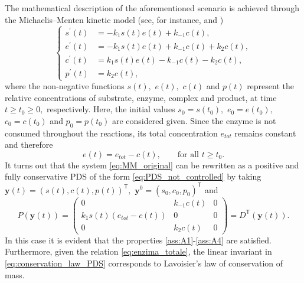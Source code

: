 \documentclass[10pt]{article}
\theoremstyle{remark}
\newcommand{\tpose}{^\mathsf{T}}
\theoremstyle{definition}
\theoremstyle{remark}
\begin{document}
The mathematical description of the aforementioned scenario is achieved through the Michaelis–Menten kinetic model (see, for instance, \cite[Section 3.1]{Ingalls2013} and \cite{Michaelis2})
\begin{equation}\label{eq:MM_original}
    \left\{
    \begin{aligned}
        s^{\prime}(t) &= - k_1 s(t)e(t) + k_{-1} c(t), \\
        e^{\prime}(t) &= - k_1 s(t) e(t) + k_{-1} c(t) + k_2  c(t), \\
        c^{\prime}(t) &= k_1 s(t) e(t) - k_{-1} c(t) -  k_2 c(t), \\
        p^{\prime}(t) &= k_2 c(t),
    \end{aligned}
    \right.
\end{equation}
where the non-negative functions $s(t),$ $e(t),$ $c(t)$ and $p(t)$ represent the relative concentrations of substrate, enzyme, complex and product, at time $t\geq t_0\geq 0,$ respectively. Here, the initial values $s_0=s(t_0),$ $e_0=e(t_0),$ $c_0=c(t_0)$ and $p_0=p(t_0)$ are considered given. 
Since the enzyme is not consumed throughout the reactions, its total concentration $e_{tot}$ remains constant and therefore
\begin{equation}\label{eq:enzima_totale}
    e(t) = e_{tot} - c(t), \qquad \mbox{for all } t \geq t_0.
\end{equation}
It turns out that the system \eqref{eq:MM_original} can be rewritten as a positive and fully conservative PDS of the form \eqref{eq:PDS_not_controlled} by taking  $\bm{y}(t)=(s(t),c(t),p(t))\tpose,$ $\bm{y}^0=(s_0,c_0,p_0)\tpose$ and
\begin{equation}\label{eq:enzyme_PDS}
    P(\bm{y}(t))=\begin{pmatrix}
        0 & k_{-1}c(t) & 0 \\
         k_1 s(t)(e_{tot} - c(t)) & 0 & 0 \\
          0 & k_2c(t) & 0 
    \end{pmatrix}=D\tpose(\bm{y}(t)).
\end{equation}
In this case it is evident that the properties \ref{ass:A1}-\ref{ass:A4} are satisfied. Furthermore, given the relation \eqref{eq:enzima_totale}, the linear invariant in \eqref{eq:conservation_law_PDS} corresponds to Lavoisier's law of conservation of mass.
\end{document}
